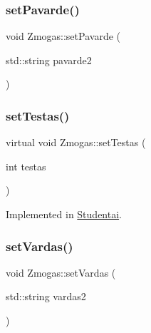 \mbox{\label{class_zmogas_a0f5cb4ac9fb479662d238a38ca45a233}} 
\subsubsection{\texorpdfstring{setPavarde()}{setPavarde()}}
{\footnotesize\ttfamily void Zmogas\+::set\+Pavarde (\begin{DoxyParamCaption}\item[{std\+::string}]{pavarde2 }\end{DoxyParamCaption})\hspace{0.3cm}{\ttfamily [inline]}}

\mbox{\label{class_zmogas_aa51276c9b36f9a415dc32052b4ca048b}} 
\subsubsection{\texorpdfstring{setTestas()}{setTestas()}}
{\footnotesize\ttfamily virtual void Zmogas\+::set\+Testas (\begin{DoxyParamCaption}\item[{int}]{testas }\end{DoxyParamCaption})\hspace{0.3cm}{\ttfamily [pure virtual]}}



Implemented in \mbox{\hyperlink{class_studentai_abfe64d0425d89f99f1a90001ba4b6b0c}{Studentai}}.

\mbox{\label{class_zmogas_a239a2dd985df7bb9a1003da4a4564d6a}} 
\subsubsection{\texorpdfstring{setVardas()}{setVardas()}}
{\footnotesize\ttfamily void Zmogas\+::set\+Vardas (\begin{DoxyParamCaption}\item[{std\+::string}]{vardas2 }\end{DoxyParamCaption})\hspace{0.3cm}{\ttfamily [inline]}}



